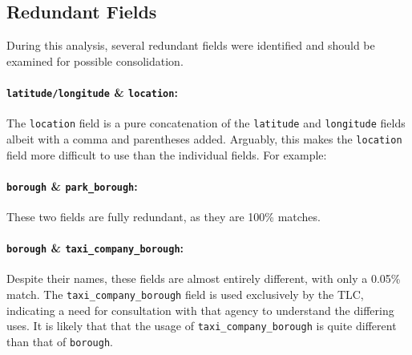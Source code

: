 \documentclass[linenumber]{jdsart}
\begin{document}
\subsection{Redundant Fields}
\label{sec:duplicates}
During this analysis, several redundant fields were identified and should 
be examined for possible consolidation.

\paragraph{\texttt{latitude/longitude} \& \texttt{location}:} 
The \texttt{location} field is a pure concatenation of 
the \texttt{latitude} and \texttt{longitude} fields albeit with a 
comma and parentheses added. Arguably, this makes the \texttt{location} field 
more difficult to use than the individual fields. For example: 

\vspace{.25cm}


\paragraph{\texttt{borough} \& \texttt{park\_borough}:} These two fields are fully redundant, 
as they are 100\% matches.

\paragraph{\texttt{borough} \& \texttt{taxi\_company\_borough}:} Despite 
their names, these fields are almost entirely different, with only 
a 0.05\% match. The \texttt{taxi\_company\_borough} field is 
used exclusively by the TLC, indicating a need for consultation 
with that agency to understand the differing uses. It is 
likely that that the usage of \texttt{taxi\_company\_borough} is 
quite different than that of \texttt{borough}. 
\end{document}
